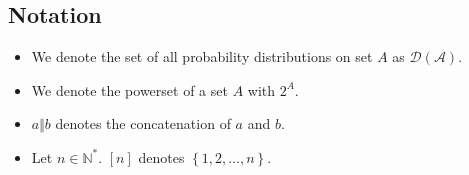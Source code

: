 \subsection{Notation}
  \begin{itemize}
    \item We denote the set of all probability distributions on set $A$ as
    $\mathcal{D\left(A\right)}$.
    \item We denote the powerset of a set $A$ with $2^A$.
    \item $a \Vert b$ denotes the concatenation of $a$ and $b$.
    \item Let $n \in \mathbb{N}^*$. $\left[n\right]$ denotes $\left\{1, 2,
    \dots, n\right\}$.
  \end{itemize}
